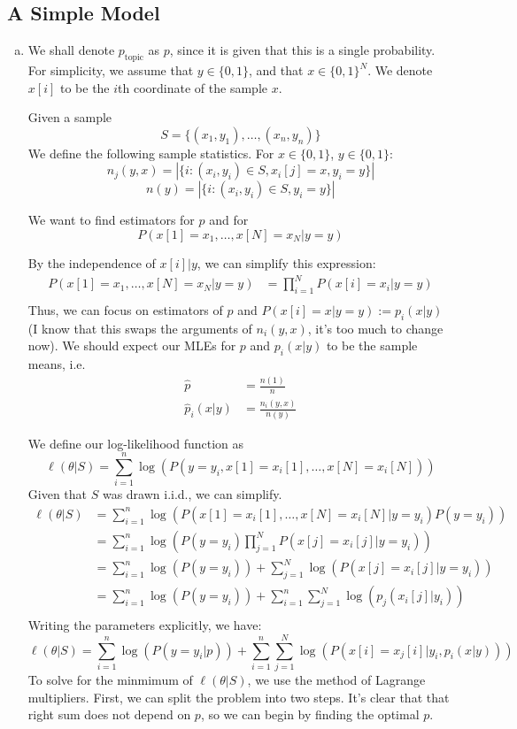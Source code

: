 \documentclass{amsart}
\theoremstyle{definition}
\begin{document}
\subsection{A Simple Model}
\begin{enumerate}[(a)]
  	\item 
		We shall denote $p_{\mathrm{topic}}$ as $p$, since it is given that this is a single probability. 
		For simplicity, we assume that $y \in \{0, 1\}$, and that $x \in \{0, 1\}^N$.
		We denote $x[i]$ to be the $i$th coordinate of the sample $x$. 

		Given a sample 
		\[
		S = \{(x_1,y_1), \ldots, (x_n, y_n)\}
		\]
		We define the following sample statistics. For $x \in \{0,1\}$, $y \in \{0,1\}$:
		\[n_j(y, x) = |\{i : (x_i, y_i)\in S, x_i[j] = x, y_i = y\}|\]
		\[n(y) = |\{i : (x_i, y_i)\in S, y_i = y\}|\]

		We want to find estimators for $p$ and for  
		\[P(x[1] = x_1, \ldots, x[N] = x_N | y = y)\]

		By the independence of $x[i] | y$, we can simplify this expression:
		\begin{align*}
			P(x[1] = x_1, \ldots, x[N] = x_N | y = y) &= \prod_{i=1}^N P(x[i] = x_i | y = y)\\
		\end{align*}
		Thus, we can focus on estimators of $p$ and $P(x[i] = x | y = y) := p_i(x|y)$ (I know that this swaps the arguments of $n_i(y, x)$, it's too much to change now).
		We should expect our MLEs for $p$ and $p_i(x|y)$ to be the sample means, i.e. 
		\begin{align*}
		\hat{p} &= \frac{n(1)}{n}\\
		\hat{p}_i(x|y) &= \frac{n_i(y, x)}{n(y)}
		\end{align*}
		
		We define our log-likelihood function as
		\[\ell(\theta|S) = \sum_{i=1}^{n}\log(P(y = y_i, x[1] = x_i[1], \ldots, x[N] = x_i[N] )) \]
		Given that $S$ was drawn i.i.d., we can simplify.
		\begin{align*}
			\ell(\theta|S) &= \sum_{i=1}^{n}\log(P(x[1] = x_i[1], \ldots, x[N] = x_i[N] | y = y_i)P(y = y_i))  \\
			&= \sum_{i=1}^{n}\log(P(y=y_i)\prod_{j=1}^{N} P(x[j] = x_i[j]|y = y_i))\\
			&= \sum_{i=1}^{n}\log(P(y = y_i)) + \sum_{j=1}^{N} \log(P(x[j] = x_i[j]|y = y_i))\\
			&= \sum_{i=1}^{n}\log(P(y = y_i)) + \sum_{i=1}^{n}\sum_{j=1}^{N} \log(p_j(x_i[j]|y_i))\\
		\end{align*}
		Writing the parameters explicitly, we have:
		\[
		\ell(\theta|S) = \sum_{i=1}^{n}\log(P(y = y_i|p)) + \sum_{i=1}^{n}\sum_{j=1}^{N} \log(P(x[i] = x_j[i]| y_i, p_i(x|y)))
		\]
		To solve for the minmimum of $\ell(\theta|S)$, we use the method of Lagrange multipliers. 
		First, we can split the problem into two steps. It's clear that that right sum does not depend on $p$, 
		so we can begin by finding the optimal $p$.


\end{enumerate}
\end{document}
